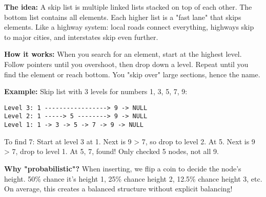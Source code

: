 \textbf{The idea:} A skip list is multiple linked lists stacked on top of each other. The bottom list contains all elements. Each higher list is a "fast lane" that skips elements. Like a highway system: local roads connect everything, highways skip to major cities, and interstates skip even further.

\textbf{How it works:} When you search for an element, start at the highest level. Follow pointers until you overshoot, then drop down a level. Repeat until you find the element or reach bottom. You "skip over" large sections, hence the name.

\textbf{Example:} Skip list with 3 levels for numbers 1, 3, 5, 7, 9:
\begin{verbatim}
Level 3: 1 -----------------> 9 -> NULL
Level 2: 1 -----> 5 --------> 9 -> NULL
Level 1: 1 -> 3 -> 5 -> 7 -> 9 -> NULL
\end{verbatim}

To find 7: Start at level 3 at 1. Next is 9 > 7, so drop to level 2. At 5. Next is 9 > 7, drop to level 1. At 5, 7, found! Only checked 5 nodes, not all 9.

\textbf{Why "probabilistic"?} When inserting, we flip a coin to decide the node's height. 50\% chance it's height 1, 25\% chance height 2, 12.5\% chance height 3, etc. On average, this creates a balanced structure without explicit balancing!

